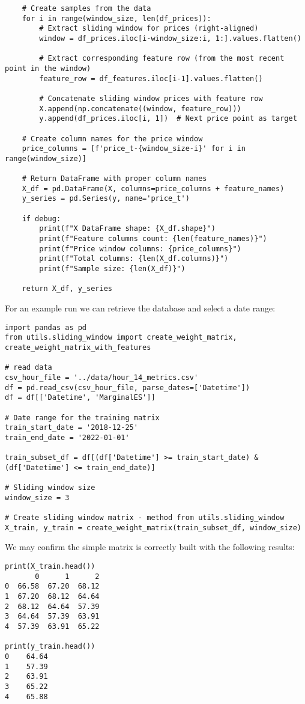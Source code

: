 \documentclass[12pt]{report} %
\begin{document}
\begin{lstlisting}
    # Create samples from the data
    for i in range(window_size, len(df_prices)):
        # Extract sliding window for prices (right-aligned)
        window = df_prices.iloc[i-window_size:i, 1:].values.flatten()
        
        # Extract corresponding feature row (from the most recent point in the window)
        feature_row = df_features.iloc[i-1].values.flatten()
        
        # Concatenate sliding window prices with feature row
        X.append(np.concatenate((window, feature_row)))
        y.append(df_prices.iloc[i, 1])  # Next price point as target
    
    # Create column names for the price window
    price_columns = [f'price_t-{window_size-i}' for i in range(window_size)]
    
    # Return DataFrame with proper column names
    X_df = pd.DataFrame(X, columns=price_columns + feature_names)
    y_series = pd.Series(y, name='price_t')
    
    if debug:
        print(f"X DataFrame shape: {X_df.shape}")
        print(f"Feature columns count: {len(feature_names)}")
        print(f"Price window columns: {price_columns}")
        print(f"Total columns: {len(X_df.columns)}")
        print(f"Sample size: {len(X_df)}")
    
    return X_df, y_series
\end{lstlisting}

For an example run we can retrieve the database and select a date range:
\begin{lstlisting}
import pandas as pd
from utils.sliding_window import create_weight_matrix, create_weight_matrix_with_features

# read data
csv_hour_file = '../data/hour_14_metrics.csv'
df = pd.read_csv(csv_hour_file, parse_dates=['Datetime'])
df = df[['Datetime', 'MarginalES']]

# Date range for the training matrix
train_start_date = '2018-12-25'
train_end_date = '2022-01-01'

train_subset_df = df[(df['Datetime'] >= train_start_date) & (df['Datetime'] <= train_end_date)]

# Sliding window size
window_size = 3

# Create sliding window matrix - method from utils.sliding_window
X_train, y_train = create_weight_matrix(train_subset_df, window_size)
\end{lstlisting}

We may confirm the simple matrix is correctly built with the following results:
\begin{small}
\begin{verbatim}
print(X_train.head())
       0      1      2
0  66.58  67.20  68.12
1  67.20  68.12  64.64
2  68.12  64.64  57.39
3  64.64  57.39  63.91
4  57.39  63.91  65.22

print(y_train.head())
0    64.64
1    57.39
2    63.91
3    65.22
4    65.88
\end{verbatim}
\end{small}
\end{document}
